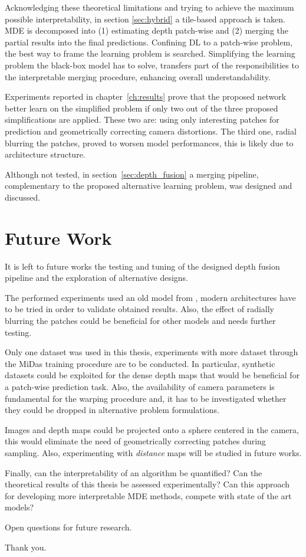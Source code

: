 Acknowledging these theoretical limitations and trying to achieve the maximum possible interpretability, in section \ref{sec:hybrid} a tile-based approach is taken.
MDE is decomposed into (1) estimating depth patch-wise and (2) merging the partial results into the final predictions.
Confining DL to a patch-wise problem, the best way to frame the learning problem is searched.
Simplifying the learning problem the black-box model has to solve, transfers part of the responsibilities to the interpretable merging procedure, enhancing overall understandability.

Experiments reported in chapter~\ref{ch:results} prove that the proposed network better learn on the simplified problem if only two out of the three proposed simplifications are applied.
These two are: using only interesting patches for prediction and geometrically correcting camera distortions.
The third one, radial blurring the patches, proved to worsen model performances, this is likely due to architecture structure.

Although not tested, in section~\ref{sec:depth_fusion} a merging pipeline, complementary to the proposed alternative learning problem, was designed and discussed.

\section{Future Work}
It is left to future works the testing and tuning of the designed depth fusion pipeline and the exploration of alternative designs.

The performed experiments used an old model from \cite{Eigen}, modern architectures have to be tried in order to validate obtained results.
Also, the effect of radially blurring the patches could be beneficial for other models and needs further testing.

Only one dataset was used in this thesis, experiments with more dataset through the MiDas \cite{MiDas} training procedure are to be conducted.
In particular, synthetic datasets could be exploited for the dense depth maps that would be beneficial for a patch-wise prediction task.
Also, the availability of camera parameters is fundamental for the warping procedure and, it has to be investigated whether they could be dropped in alternative problem formulations.

Images and depth maps could be projected onto a sphere centered in the camera, this would eliminate the need of geometrically correcting patches during sampling.
Also, experimenting with \textit{distance} maps will be studied in future works.

Finally, can the interpretability of an algorithm be quantified?
Can the theoretical results of this thesis be assessed experimentally?
Can this approach for developing more interpretable MDE methods, compete with state of the art models?

Open questions for future research.

\vfill

Thank you.